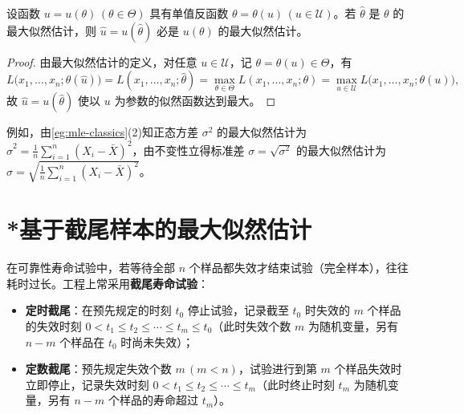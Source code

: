 \begin{proposition}[最大似然估计的不变性]
\label{prop:mle-invariance}
设函数 $u=u(\theta)\,(\theta\in\Theta)$ 具有单值反函数 $\theta=\theta(u)\,(u\in\mathcal{U})$。若 $\hat{\theta}$ 是 $\theta$ 的最大似然估计，则 $\hat{u}=u(\hat{\theta})$ 必是 $u(\theta)$ 的最大似然估计。
\end{proposition}
\begin{proof}
由最大似然估计的定义，对任意 $u\in\mathcal{U}$，记 $\theta=\theta(u)\in\Theta$，有
\[
  L\bigl(x_1,\ldots,x_n;\theta(\hat{u})\bigr)
  =L(x_1,\ldots,x_n;\hat{\theta})
  =\max_{\theta\in\Theta}L(x_1,\ldots,x_n;\theta)
  =\max_{u\in\mathcal{U}}L\bigl(x_1,\ldots,x_n;\theta(u)\bigr),
\]
故 $\hat{u}=u(\hat{\theta})$ 使以 $u$ 为参数的似然函数达到最大。
\end{proof}

例如，由\cref{eg:mle-classics}(2)知正态方差 $\sigma^2$ 的最大似然估计为 $\hat{\sigma}^2=\frac{1}{n}\sum_{i=1}^{n}(X_i-\bar{X})^2$，由不变性立得标准差 $\sigma=\sqrt{\sigma^2}$ 的最大似然估计为 $\hat{\sigma}=\sqrt{\frac{1}{n}\sum_{i=1}^{n}(X_i-\bar{X})^2}$。

\section{*基于截尾样本的最大似然估计}
\label{sec:censored-mle}

在可靠性寿命试验中，若等待全部 $n$ 个样品都失效才结束试验（完全样本），往往耗时过长。工程上常采用\textbf{截尾寿命试验}：
\begin{itemize}
  \item \textbf{定时截尾}：在预先规定的时刻 $t_0$ 停止试验，记录截至 $t_0$ 时失效的 $m$ 个样品的失效时刻 $0<t_1\le t_2\le\cdots\le t_m\le t_0$（此时失效个数 $m$ 为随机变量，另有 $n-m$ 个样品在 $t_0$ 时尚未失效）；
  \item \textbf{定数截尾}：预先规定失效个数 $m\,(m<n)$，试验进行到第 $m$ 个样品失效时立即停止，记录失效时刻 $0<t_1\le t_2\le\cdots\le t_m$（此时终止时刻 $t_m$ 为随机变量，另有 $n-m$ 个样品的寿命超过 $t_m$）。
\end{itemize}


